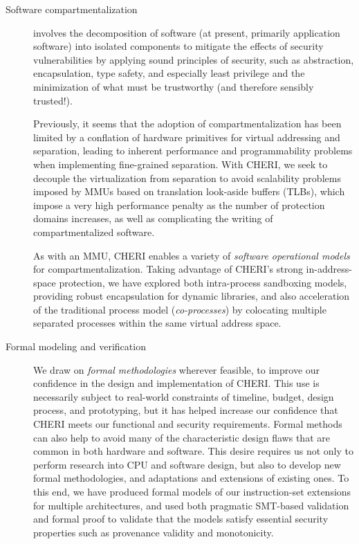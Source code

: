 \begin{description}
\item[Software compartmentalization]
involves the decomposition of software (at present, primarily
application software)
into isolated components to
mitigate the effects of security vulnerabilities by applying
sound principles of security, such as abstraction, encapsulation,
type safety, and especially least privilege and the minimization of
what must be trustworthy (and therefore sensibly trusted!).

Previously, it seems that the
adoption of compartmentalization has been limited by a conflation of hardware
primitives for virtual addressing and separation, leading to inherent performance and
programmability problems when implementing fine-grained separation.
With CHERI, we seek to decouple the virtualization from separation to avoid
scalability problems imposed by MMUs based on translation look-aside buffers
(TLBs), which impose a very high performance penalty as the number of
protection domains increases, as well as complicating the writing of compartmentalized software.

As with an MMU, CHERI enables a variety of \textit{software operational
models} for compartmentalization.
Taking advantage of CHERI's strong in-address-space protection, we have
explored both intra-process sandboxing models, providing robust encapsulation
for dynamic libraries, and also acceleration of the traditional process model
(\textit{co-processes}) by colocating multiple separated processes within the
same virtual address space.

\item[Formal modeling and verification]
We draw on {\it formal methodologies} wherever feasible, to improve our confidence in the design and implementation of CHERI.
This use is necessarily subject to real-world constraints of timeline, budget, design process,
and prototyping, but it has helped increase our confidence that CHERI meets our
functional and security requirements.
Formal methods can also help to avoid many of
the characteristic design flaws that are common in both hardware and software.
This desire requires us not only to perform research into CPU and software design, but also to
develop new formal methodologies, and adaptations and extensions of existing ones.
To this end, we have produced formal models of our instruction-set extensions
for multiple architectures, and used both pragmatic SMT-based validation and
formal proof to validate that the models satisfy essential security
properties such as provenance validity and monotonicity.


\end{description}
